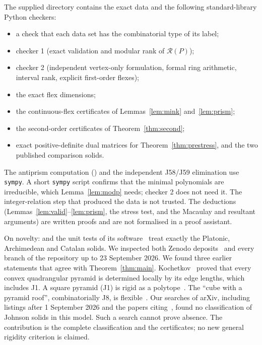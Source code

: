 \documentclass[11pt]{amsart}
\theoremstyle{remark}
\newcommand{\RR}{\mathcal R}
\begin{document}
The supplied directory  contains the exact data and the following standard-library Python checkers:
\begin{itemize}
\item a check that each data set has the combinatorial type of its label;
\item checker 1 (exact validation and modular rank of $\RR(P)$);
\item checker 2 (independent vertex-only formulation, formal ring arithmetic, interval rank, explicit first-order flexes);
\item the exact flex dimensions;
\item the continuous-flex certificates of Lemmas~\ref{lem:mink} and~\ref{lem:prism};
\item the second-order certificates of Theorem~\ref{thm:second};
\item exact positive-definite dual matrices for Theorem~\ref{thm:prestress}, and the two published comparison solids.
\end{itemize}
The antiprism computation () and the independent J58/J59 elimination use \texttt{sympy}.
A short \texttt{sympy} script confirms that the minimal polynomials are irreducible, which Lemma~\ref{lem:modp} needs; checker 2 does not need it. The integer-relation step that produced the data is not trusted. The deductions (Lemmas~\ref{lem:valid}--\ref{lem:prism}, the stress test, and the Macaulay and resultant arguments) are written proofs and are not formalised in a proof assistant.

On novelty: \cite{AHWZ2026} and the unit tests of its software~\cite{DeformationPaths} treat exactly the Platonic, Archimedean and Catalan solids. We inspected both Zenodo deposits~\cite{AHWZsupp,DeformationPathsZenodo} and every branch of the repository up to 23 September 2026. We found three earlier statements that agree with Theorem~\ref{thm:main}. Kochetkov~\cite{Kochetkov2020} proved that every convex quadrangular pyramid is determined locally by its edge lengths, which includes J1. A square pyramid (J1) is rigid as a polytope~\cite[Fig.~16]{Winter2023}. The ``cube with a pyramid roof'', combinatorially J8, is flexible~\cite[Fig.~6]{HSW2026}. Our searches of arXiv, including listings after 1 September 2026 and the papers citing~\cite{AHWZ2026}, found no classification of Johnson solids in this model. Such a search cannot prove absence. The contribution is the complete classification and the certificates; no new general rigidity criterion is claimed.
\end{document}
